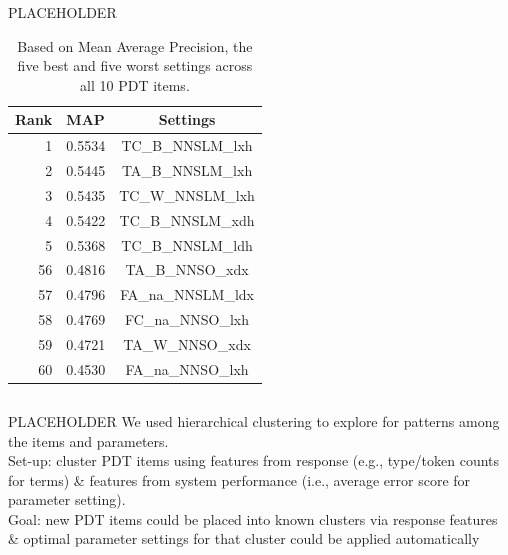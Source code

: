 \documentclass[final,t]{beamer}
\begin{document}
\begin{frame}{}
\begin{columns}[t]
\begin{column}{.64\linewidth}
\begin{columns}
\begin{column}{.49\linewidth}
\begin{block}{PLACEHOLDER}
\begin{multicols}{2}
\begin{table}[htb!]
\begin{center}
\begin{tabular}{|r|l|c|}
 \hline
 Rank & MAP & Settings \\
 \hline
 \hline
1 & 0.5534 & TC\_B\_NNSLM\_lxh \\
\hline
2 & 0.5445 & TA\_B\_NNSLM\_lxh \\
\hline
3 & 0.5435 & TC\_W\_NNSLM\_lxh \\
\hline
4 & 0.5422 & TC\_B\_NNSLM\_xdh \\
\hline
5 & 0.5368 & TC\_B\_NNSLM\_ldh \\
 \hline
 \hline
56 & 0.4816 & TA\_B\_NNSO\_xdx \\
\hline
57 & 0.4796 & FA\_na\_NNSLM\_ldx \\
\hline
58 & 0.4769 & FC\_na\_NNSO\_lxh \\
\hline
59 & 0.4721 & TA\_W\_NNSO\_xdx \\
\hline
60 & 0.4530 & FA\_na\_NNSO\_lxh \\
\hline
\end{tabular}
\begin{minipage}{.86\columnwidth}
\vspace{.7em}
\caption{Based on Mean Average Precision, the five best and five worst settings across all 10 PDT items.}
\label{tab:all-dist-ranked-settings}
\end{minipage}
\end{center}
\end{table}

\end{multicols}

\end{block}

\end{column}
\end{columns}

\begin{block}{PLACEHOLDER}
We used hierarchical clustering to explore for patterns among the items and parameters.\\
\mbox{}\hfill Set-up: cluster PDT items using features from response (e.g., type/token counts for terms) \& features from system performance (i.e., average error score for parameter setting).\hfill\mbox{}
\\\mbox{}\hfill Goal: new PDT items could be placed into known clusters via response features \& optimal parameter settings for that cluster could be applied automatically\\ 


\end{block}
\end{column}
\end{columns}
\end{frame}
\end{document}
